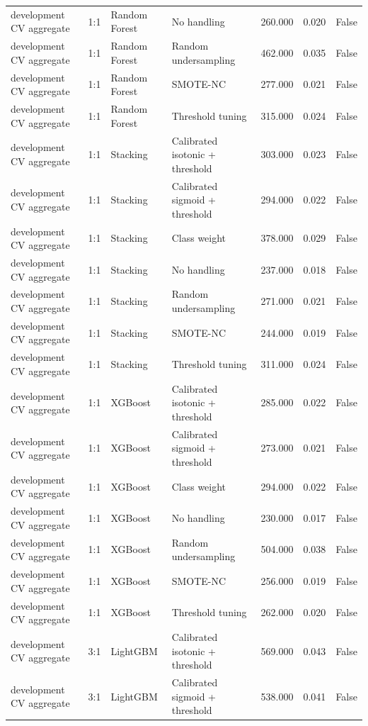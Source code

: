 \begin{tabular}{llllrrr}
development CV aggregate & 1:1 & Random Forest & No handling & 260.000 & 0.020 & False \\
development CV aggregate & 1:1 & Random Forest & Random undersampling & 462.000 & 0.035 & False \\
development CV aggregate & 1:1 & Random Forest & SMOTE-NC & 277.000 & 0.021 & False \\
development CV aggregate & 1:1 & Random Forest & Threshold tuning & 315.000 & 0.024 & False \\
development CV aggregate & 1:1 & Stacking & Calibrated isotonic + threshold & 303.000 & 0.023 & False \\
development CV aggregate & 1:1 & Stacking & Calibrated sigmoid + threshold & 294.000 & 0.022 & False \\
development CV aggregate & 1:1 & Stacking & Class weight & 378.000 & 0.029 & False \\
development CV aggregate & 1:1 & Stacking & No handling & 237.000 & 0.018 & False \\
development CV aggregate & 1:1 & Stacking & Random undersampling & 271.000 & 0.021 & False \\
development CV aggregate & 1:1 & Stacking & SMOTE-NC & 244.000 & 0.019 & False \\
development CV aggregate & 1:1 & Stacking & Threshold tuning & 311.000 & 0.024 & False \\
development CV aggregate & 1:1 & XGBoost & Calibrated isotonic + threshold & 285.000 & 0.022 & False \\
development CV aggregate & 1:1 & XGBoost & Calibrated sigmoid + threshold & 273.000 & 0.021 & False \\
development CV aggregate & 1:1 & XGBoost & Class weight & 294.000 & 0.022 & False \\
development CV aggregate & 1:1 & XGBoost & No handling & 230.000 & 0.017 & False \\
development CV aggregate & 1:1 & XGBoost & Random undersampling & 504.000 & 0.038 & False \\
development CV aggregate & 1:1 & XGBoost & SMOTE-NC & 256.000 & 0.019 & False \\
development CV aggregate & 1:1 & XGBoost & Threshold tuning & 262.000 & 0.020 & False \\
development CV aggregate & 3:1 & LightGBM & Calibrated isotonic + threshold & 569.000 & 0.043 & False \\
development CV aggregate & 3:1 & LightGBM & Calibrated sigmoid + threshold & 538.000 & 0.041 & False \\

\end{tabular}
